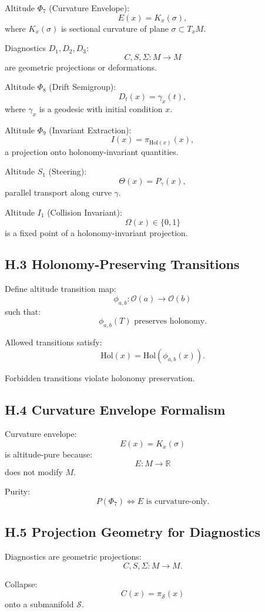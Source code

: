 Altitude $\Phi_7$ (Curvature Envelope):
\[
E(x) = K_x(\sigma),
\]
where $K_x(\sigma)$ is sectional curvature of plane $\sigma \subset T_x M$.

Diagnostics $D_1, D_2, D_3$:
\[
C,S,\Sigma : M \to M
\]
are geometric projections or deformations.

Altitude $\Phi_8$ (Drift Semigroup):
\[
D_t(x) = \gamma_x(t),
\]
where $\gamma_x$ is a geodesic with initial condition $x$.

Altitude $\Phi_9$ (Invariant Extraction):
\[
I(x) = \pi_{\mathrm{Hol}(x)}(x),
\]
a projection onto holonomy-invariant quantities.

Altitude $S_1$ (Steering):
\[
\Theta(x) = P_{\gamma}(x),
\]
parallel transport along curve $\gamma$.

Altitude $I_1$ (Collision Invariant):
\[
\Omega(x) \in \{0,1\}
\]
is a fixed point of a holonomy-invariant projection.

\subsection*{H.3 Holonomy-Preserving Transitions}

Define altitude transition map:
\[
\phi_{a,b} : \mathcal{O}(a) \to \mathcal{O}(b)
\]
such that:
\[
\phi_{a,b}(T) \text{ preserves holonomy}.
\]

Allowed transitions satisfy:
\[
\mathrm{Hol}(x) = \mathrm{Hol}(\phi_{a,b}(x)).
\]

Forbidden transitions violate holonomy preservation.

\subsection*{H.4 Curvature Envelope Formalism}

Curvature envelope:
\[
E(x) = K_x(\sigma)
\]
is altitude-pure because:
\[
E : M \to \mathbb{R}
\]
does not modify $M$.

Purity:
\[
P(\Phi_7) \iff E \text{ is curvature-only}.
\]

\subsection*{H.5 Projection Geometry for Diagnostics}

Diagnostics are geometric projections:
\[
C,S,\Sigma : M \to M.
\]

Collapse:
\[
C(x) = \pi_{\mathcal{S}}(x)
\]
onto a submanifold $\mathcal{S}$.

